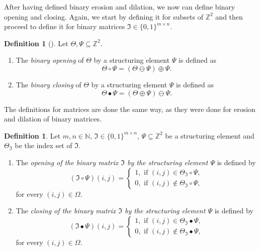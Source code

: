 \documentclass[a4paper,12pt]{article}
\theoremstyle{plain}
\theoremstyle{definition}
\newtheorem{definition}[theorem]{Definition}
\begin{document}
After having defined binary erosion and dilation, we now can define binary opening and closing. Again, we start by defining it for subsets of $\mathbb{Z}^2$ and then proceed to define it for binary matrices $\mathfrak{I} \in \{ 0, 1 \}^{m \times n}$.
\begin{definition}[{\cite[p.~68-69]{imageprocessing}}]
	Let $\Theta, \Psi \subseteq \mathbb{Z}^2$.
	\begin{enumerate}
		\item The \emph{binary opening} of $\Theta$ by a structuring element $\Psi$ is defined as
		\begin{equation*}
			\Theta \circ \Psi = (\Theta \ominus \Psi) \oplus \Psi.
		\end{equation*}
		\item The \emph{binary closing} of $\Theta$ by a structuring element $\Psi$ is defined as
		\begin{equation*}
			\Theta \bullet \Psi = (\Theta \oplus \Psi) \ominus \Psi.
		\end{equation*}
	\end{enumerate}
\end{definition}

The definitions for matrices are done the same way, as they were done for erosion and dilation of binary matrices.

\begin{definition}
	Let $m, n \in \mathbb{N}$, $\mathfrak{I} \in \{ 0, 1 \}^{m \times n}$, $\Psi \subseteq \mathbb{Z}^2$ be a structuring element and $\Theta_\mathfrak{I}$ be the index set of $\mathfrak{I}$.
	\begin{enumerate}
		\item The \emph{opening of the binary matrix $\mathfrak{I}$ by the structuring element $\Psi$} is defined by
		\begin{equation}
			(\mathfrak{I} \circ \Psi)(i, j) =
			\begin{cases}
				1, \textrm{ if } (i, j) \in \Theta_\mathfrak{I} \circ \Psi, \\
				0, \textrm{ if } (i, j) \notin \Theta_\mathfrak{I} \circ \Psi,
			\end{cases}
		\end{equation}
		for every $(i, j) \in \Omega$.
		\item The \emph{closing of the binary matrix $\mathfrak{I}$ by the structuring element $\Psi$} is defined by
		\begin{equation}
			(\mathfrak{I} \bullet \Psi)(i, j) =
			\begin{cases}
				1, \textrm{ if } (i, j) \in \Theta_\mathfrak{I} \bullet \Psi, \\
				0, \textrm{ if } (i, j) \notin \Theta_\mathfrak{I} \bullet \Psi,
			\end{cases}
		\end{equation}
		for every $(i, j) \in \Omega$.
	\end{enumerate}
\end{definition}
\end{document}
